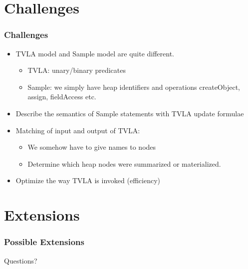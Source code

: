 \documentclass [xcolor=svgnames]{beamer} %
\begin{document}
\section{Challenges}
\begin{frame}[fragile]
\frametitle{Challenges}
\begin{itemize}
  \item<1-> TVLA model and Sample model are quite different.
    \begin{itemize}
      \item TVLA: unary/binary predicates
      \item Sample: we simply have heap identifiers and operations createObject, assign, fieldAccess etc.
    \end{itemize}
  \item<2-> Describe the semantics of Sample statements with TVLA \textcolor{pacificblue}{update formulae}
  \item<3-> Matching of input and output of TVLA: 
    \begin{itemize}
      \item We somehow have to give names to nodes
      \item Determine which heap nodes were summarized or materialized. 
    \end{itemize}
\item<4-> Optimize the way TVLA is invoked (efficiency)
  
\end{itemize}
\end{frame}


\section{Extensions}
\begin{frame}
\frametitle{Possible Extensions}

\pause
{}
\pause
{}
\end{frame}

\begin{frame}
  \begin{center}
   \Huge{Questions?} 
  \end{center}
\end{frame}
\end{document}
